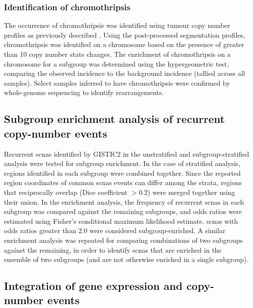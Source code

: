 \subsubsection{Identification of chromothripsis}

The occurrence of chromothripsis was identified using tumour copy number profiles as previously described . Using the post-processed segmentation profiles, chromothripsis was identified on a chromosome based on the presence of greater than 10 copy number state changes. The enrichment of chromothripsis on a chromosome for a subgroup was determined using the hypergeometric test, comparing the observed incidence to the background incidence (tallied across all samples). Select samples inferred to have chromothripsis were confirmed by whole-genome sequencing to identify rearrangements.

\subsection{Subgroup enrichment analysis of recurrent copy-number events}

Recurrent \gls{scnas} identified by GISTIC2 in the unstratified and subgroup-stratified analysis were tested for subgroup enrichment. In the case of stratified analysis, regions identified in each subgroup were combined together. Since the reported region coordinates of common \gls{scnas} events can differ among the strata, regions that reciprocally overlap (Dice coefficient $> 0.2$) were merged together using their union. In the enrichment analysis, the frequency of recurrent \gls{scnas} in each subgroup was compared against the remaining subgroups, and odds ratios were estimated using Fisher's conditional maximum likelihood estimate. \gls{scnas} with odds ratios greater than 2.0 were considered subgroup-enriched. A similar enrichment analysis was repeated for comparing combinations of two subgroups against the remaining, in order to identify \gls{scnas} that are enriched in the ensemble of two subgroups (and are not otherwise enriched in a single subgroup).

\subsection{Integration of gene expression and copy-number events}

